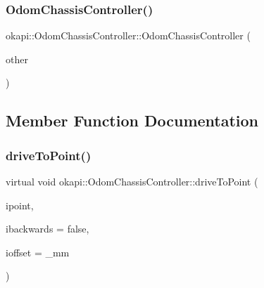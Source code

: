 \mbox{\label{classokapi_1_1OdomChassisController_a841d9679487509c9805e030ad7a663a9}} 
\subsubsection{\texorpdfstring{OdomChassisController()}{OdomChassisController()}\hspace{0.1cm}{\footnotesize\ttfamily [3/3]}}
{\footnotesize\ttfamily okapi\+::\+Odom\+Chassis\+Controller\+::\+Odom\+Chassis\+Controller (\begin{DoxyParamCaption}\item[{\mbox{\hyperlink{classokapi_1_1OdomChassisController}{Odom\+Chassis\+Controller}} \&\&}]{other }\end{DoxyParamCaption})\hspace{0.3cm}{\ttfamily [delete]}}



\subsection{Member Function Documentation}
\mbox{\label{classokapi_1_1OdomChassisController_abea9bd3860ad9f1acb1cdc1e36869fbf}} 
\subsubsection{\texorpdfstring{driveToPoint()}{driveToPoint()}}
{\footnotesize\ttfamily virtual void okapi\+::\+Odom\+Chassis\+Controller\+::drive\+To\+Point (\begin{DoxyParamCaption}\item[{const \mbox{\hyperlink{structokapi_1_1Point}{Point}} \&}]{ipoint,  }\item[{bool}]{ibackwards = {\ttfamily false},  }\item[{const Q\+Length \&}]{ioffset = {\+\_\+mm} }\end{DoxyParamCaption})\hspace{0.3cm}{\ttfamily [pure virtual]}}

